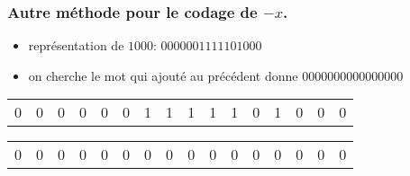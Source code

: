 \begin{frame}
  \frametitle{Autre méthode pour le codage de $-x$.}
\begin{itemize}
  \item représentation de $1000$: $0000001111101000$
  \item on cherche le mot qui ajouté au précédent donne $0000000000000000$ 
\end{itemize}
\begin{tabular}{cccccccccccccccc}
  0 & 0 & 0 & 0 & 0 & 0 & 1 & 1 & 1 & 1 & 1 & 0 & 1 & 0 & 0 & 0 \\
\end{tabular}

\begin{tabular}{cccccccccccccccc} \hline
  0 & 0 & 0 & 0 & 0 & 0 & 0 & 0 & 0 & 0 & 0 & 0 & 0 & 0 & 0 & 0 \\
\end{tabular}

\end{frame}


